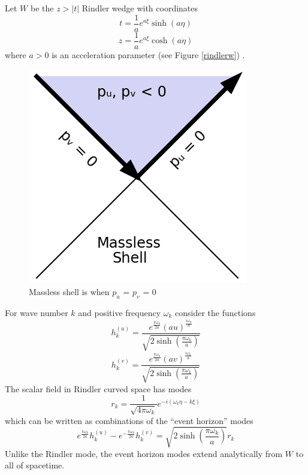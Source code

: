 \documentclass[12pt,a4paper]{article}
\begin{document}
Let $W$ be the $z>|t|$ Rindler wedge with coordinates
\begin{equation}
t = \frac{1}{a}e^{a\xi}\sinh{(a\eta)}
\end{equation}
\begin{equation}
z = \frac{1}{a}e^{a\xi}\cosh{(a\eta)}
\end{equation}
where $a>0$ is an acceleration parameter (see Figure \ref{rindlerw}) \cite{purcell}.


\begin{figure}[h]
\centering
\includegraphics[scale=1.0]{massless_shell.png}
\caption{Massless shell is when $p_u$ = $p_v$ = 0}
\label{masslessshell}
\end{figure}


For wave number $k$ and positive frequency $\omega_k$ consider the functions
\begin{equation}
h^{(u)}_k = \frac{e^{\frac{\pi \omega_k}{2a}} {(au)}^{\frac{i\omega_k}{a}}}{ \sqrt{2\sinh\left(\frac{\pi\omega_k}{a}\right)} }
\end{equation}
\begin{equation}
h^{(v)}_k = \frac{e^{\frac{\pi \omega_k}{2a}} {(av)}^{\frac{i\omega_k}{a}}}{ \sqrt{2\sinh\left(\frac{\pi\omega_k}{a}\right)} }
\end{equation}
The scalar field in Rindler curved space has modes
\begin{equation}
 r_k = \frac{1}{\sqrt{4 \pi \omega_k}} e^{-i(\omega_k \eta -k \xi)}
\end{equation}
which can be written as combinations of the ``event horizon'' modes
\begin{equation}
e^\frac{\pi\omega_k}{2a} h^{(u)}_k - e^{-\frac{\pi\omega_k}{2a}} h^{(v)}_k  = \sqrt{2 \sinh \left({\frac{\pi\omega_k}{a}}\right)} r_k
\end{equation}
Unlike the Rindler mode, the event horizon modes extend analytically from $W$ to all of spacetime.
\end{document}
